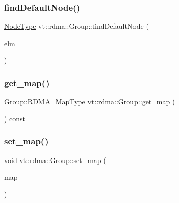 \subsubsection{\texorpdfstring{find\+Default\+Node()}{findDefaultNode()}}
{\footnotesize\ttfamily \hyperlink{namespacevt_a866da9d0efc19c0a1ce79e9e492f47e2}{Node\+Type} vt\+::rdma\+::\+Group\+::find\+Default\+Node (\begin{DoxyParamCaption}\item[{\hyperlink{namespacevt_a2c2a902092b72056f70210c159f966f0}{R\+D\+M\+A\+\_\+\+Elm\+Type} const \&}]{elm }\end{DoxyParamCaption})}

\mbox{\label{structvt_1_1rdma_1_1_group_a73a2d27f3ff477eb761d45c8b1bd6445}} 
\subsubsection{\texorpdfstring{get\+\_\+map()}{get\_map()}}
{\footnotesize\ttfamily \hyperlink{structvt_1_1rdma_1_1_group_a6a953be1b6d9907d49364a9a202d3379}{Group\+::\+R\+D\+M\+A\+\_\+\+Map\+Type} vt\+::rdma\+::\+Group\+::get\+\_\+map (\begin{DoxyParamCaption}{ }\end{DoxyParamCaption}) const}

\mbox{\label{structvt_1_1rdma_1_1_group_a726d4eafcea7fa313ceabbb6938550a1}} 
\subsubsection{\texorpdfstring{set\+\_\+map()}{set\_map()}}
{\footnotesize\ttfamily void vt\+::rdma\+::\+Group\+::set\+\_\+map (\begin{DoxyParamCaption}\item[{\hyperlink{structvt_1_1rdma_1_1_group_a6a953be1b6d9907d49364a9a202d3379}{R\+D\+M\+A\+\_\+\+Map\+Type} const \&}]{map }\end{DoxyParamCaption})}

\mbox{\label{structvt_1_1rdma_1_1_group_a53c1941f50d8c724ea56c824cd514eee}} 
